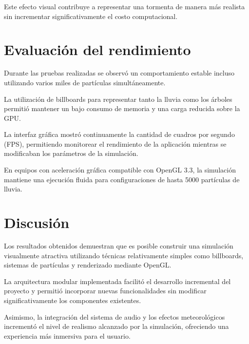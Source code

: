 Este efecto visual contribuye a representar una tormenta de manera más realista sin incrementar significativamente el costo computacional.

\section{Evaluación del rendimiento}

Durante las pruebas realizadas se observó un comportamiento estable incluso utilizando varios miles de partículas simultáneamente.

La utilización de billboards para representar tanto la lluvia como los árboles permitió mantener un bajo consumo de memoria y una carga reducida sobre la GPU.

La interfaz gráfica mostró continuamente la cantidad de cuadros por segundo (FPS), permitiendo monitorear el rendimiento de la aplicación mientras se modificaban los parámetros de la simulación.

En equipos con aceleración gráfica compatible con OpenGL 3.3, la simulación mantiene una ejecución fluida para configuraciones de hasta 5000 partículas de lluvia.

\section{Discusión}

Los resultados obtenidos demuestran que es posible construir una simulación visualmente atractiva utilizando técnicas relativamente simples como billboards, sistemas de partículas y renderizado mediante OpenGL.

La arquitectura modular implementada facilitó el desarrollo incremental del proyecto y permitió incorporar nuevas funcionalidades sin modificar significativamente los componentes existentes.

Asimismo, la integración del sistema de audio y los efectos meteorológicos incrementó el nivel de realismo alcanzado por la simulación, ofreciendo una experiencia más inmersiva para el usuario.